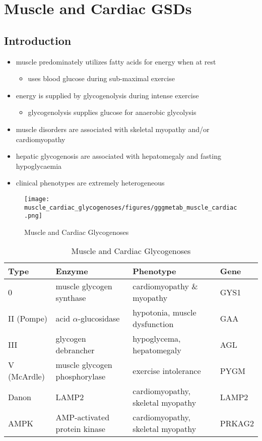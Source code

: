 \documentclass[12pt]{scrartcl}
\begin{document}
\section{Muscle and Cardiac GSDs}
\label{sec:org48c2b21}
\subsection{Introduction}
\label{sec:org21b2515}
\begin{itemize}
\item muscle predominately utilizes fatty acids for energy when at rest
\begin{itemize}
\item uses blood glucose during sub-maximal exercise
\end{itemize}
\item energy is supplied by glycogenolysis during intense exercise
\begin{itemize}
\item glycogenolysis supplies glucose for anaerobic glycolysis
\end{itemize}
\item muscle disorders are associated with skeletal myopathy and/or
cardiomyopathy
\item hepatic glycogenosis are associated with hepatomegaly and fasting
hypoglycaemia
\item clinical phenotypes are extremely heterogeneous
\end{itemize}

\begin{figure}[htbp]
\centering
\texttt{[image: muscle\_cardiac\_glycogenoses/figures/gggmetab\_muscle\_cardiac.png]}
\caption[Muscle and Cardiac Glycogenoses]{\label{fig:orgb4cafb1}Muscle and Cardiac Glycogenoses}
\end{figure}

\begin{table}[htbp]
\caption{\label{tab:orgb31b16e}Muscle and Cardiac Glycogenoses}
\centering
\begin{tabular}{llll}
Type & Enzyme & Phenotype & Gene\\
\hline
0 & muscle glycogen synthase & cardiomyopathy \& myopathy & GYS1\\
II (Pompe) & acid \(\alpha\)-glucosidase & hypotonia, muscle dysfunction & GAA\\
III\footnotemark & glycogen debrancher & hypoglycema, hepatomegaly & AGL\\
V (McArdle) & muscle glycogen phosphorylase & exercise intolerance & PYGM\\
Danon & LAMP2 & cardiomyopathy, \textpm{} skeletal myopathy & LAMP2\\
AMPK & AMP-activated protein kinase & cardiomyopathy, \textpm{} skeletal myopathy & PRKAG2\\
\end{tabular}
\end{table}
\end{document}
